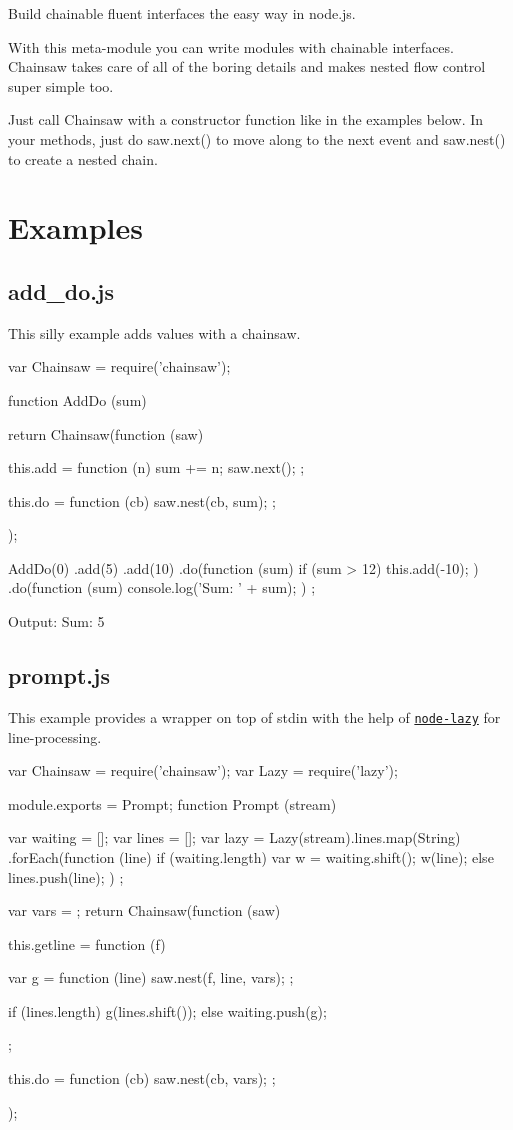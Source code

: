 Build chainable fluent interfaces the easy way in node.\+js.

With this meta-\/module you can write modules with chainable interfaces. Chainsaw takes care of all of the boring details and makes nested flow control super simple too.

Just call {\ttfamily Chainsaw} with a constructor function like in the examples below. In your methods, just do {\ttfamily saw.\+next()} to move along to the next event and {\ttfamily saw.\+nest()} to create a nested chain.

\section*{Examples }

\subsection*{add\+\_\+do.\+js }

This silly example adds values with a chainsaw. \begin{DoxyVerb}var Chainsaw = require('chainsaw');

function AddDo (sum) {
    return Chainsaw(function (saw) {
        this.add = function (n) {
            sum += n;
            saw.next();
        };

        this.do = function (cb) {
            saw.nest(cb, sum);
        };
    });
}

AddDo(0)
    .add(5)
    .add(10)
    .do(function (sum) {
        if (sum > 12) this.add(-10);
    })
    .do(function (sum) {
        console.log('Sum: ' + sum);
    })
;
\end{DoxyVerb}


Output\+: Sum\+: 5

\subsection*{prompt.\+js }

This example provides a wrapper on top of stdin with the help of \href{https://github.com/pkrumins/node-lazy}{\tt node-\/lazy} for line-\/processing. \begin{DoxyVerb}var Chainsaw = require('chainsaw');
var Lazy = require('lazy');

module.exports = Prompt;
function Prompt (stream) {
    var waiting = [];
    var lines = [];
    var lazy = Lazy(stream).lines.map(String)
        .forEach(function (line) {
            if (waiting.length) {
                var w = waiting.shift();
                w(line);
            }
            else lines.push(line);
        })
    ;

    var vars = {};
    return Chainsaw(function (saw) {
        this.getline = function (f) {
            var g = function (line) {
                saw.nest(f, line, vars);
            };

            if (lines.length) g(lines.shift());
            else waiting.push(g);
        };

        this.do = function (cb) {
            saw.nest(cb, vars);
        };
    });
}
\end{DoxyVerb}


